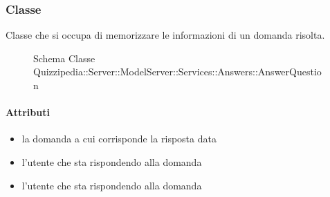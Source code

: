 \subsubsection{Classe }
Classe che si occupa di memorizzare le informazioni di un domanda risolta.
\begin{figure}[H]
\centering
\noindent{}
\caption[Schema Classe AnswerQuestion]{Schema Classe Quizzipedia::Server::ModelServer::Services::Answers::AnswerQuestion}
\end{figure}
\paragraph{Attributi}
\begin{itemize}
\item {}
\newline
la domanda a cui corrisponde la risposta data
\item {}
\newline
l'utente che sta rispondendo alla domanda
\item {}
\newline
l'utente che sta rispondendo alla domanda
\end{itemize}
